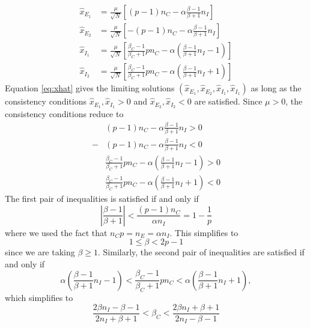 \documentclass[11pt,reqno]{amsart}
\begin{document}
\begin{equation}\label{eq:xhat}
    \begin{aligned}
        \hat{x}_{E_1} &= \frac{\mu}{\sqrt{N}}\left[ (p-1)n_C - \alpha \frac{\beta-1}{\beta+1}n_I \right] \\
        \hat{x}_{E_2} &= \frac{\mu}{\sqrt{N}}\left[ -(p-1)n_C - \alpha \frac{\beta-1}{\beta+1}n_I \right] \\
        \hat{x}_{I_1} &= \frac{\mu}{\sqrt{N}}\left[  \frac{\beta_C-1}{\beta_C+1} p n_C - \alpha \left( \frac{\beta-1}{\beta+1}n_I - 1 \right) \right] \\
        \hat{x}_{I_2} &= \frac{\mu}{\sqrt{N}}\left[  \frac{\beta_C-1}{\beta_C+1} p n_C - \alpha \left( \frac{\beta-1}{\beta+1}n_I + 1 \right) \right] 
    \end{aligned}
\end{equation}
Equation \cref{eq:xhat} gives the limiting solutions $(\hat{x}_{E_1}, \hat{x}_{E_2}, \hat{x}_{I_1}, \hat{x}_{I_1})$ as long as the consistency conditions $\hat{x}_{E_1}, \hat{x}_{I_1} > 0$ and $\hat{x}_{E_2}, \hat{x}_{I_2} < 0$ are satisfied. Since $\mu > 0$, the consistency conditions reduce to
\begin{equation}\label{eq:consistency}
    \begin{aligned}
        &(p-1)n_C - \alpha \frac{\beta-1}{\beta+1}n_I > 0 \\
        -&(p-1)n_C - \alpha \frac{\beta-1}{\beta+1}n_I < 0 \\
        &\frac{\beta_C-1}{\beta_C+1} p n_C - \alpha \left( \frac{\beta-1}{\beta+1}n_I - 1 \right) > 0 \\
        &\frac{\beta_C-1}{\beta_C+1} p n_C - \alpha \left( \frac{\beta-1}{\beta+1}n_I + 1 \right) < 0 
    \end{aligned}
\end{equation}
The first pair of inequalities is satisfied if and only if
\[
    \left| \frac{\beta-1}{\beta+1} \right| < \frac{(p-1)n_C}{\alpha n_I} = 1 - \frac{1}{p}
\]
where we used the fact that $n_C p = n_E = \alpha n_I$. This simplifies to 
\begin{equation}\label{eq:betacond}
    1 \leq \beta < 2p-1
\end{equation}
since we are taking $\beta \geq 1$. Similarly, the second pair of inequalities are satisfied if and only if 
\[
    \alpha \left( \frac{\beta-1}{\beta+1}n_I - 1 \right) < \frac{\beta_C-1}{\beta_C+1} p n_C < \alpha \left( \frac{\beta-1}{\beta+1}n_I + 1 \right),
\]
which simplifies to 
\begin{equation}
    \frac{2 \beta n_I - \beta - 1}{2 n_I + \beta + 1} < \beta_C < \frac{2 \beta n_I + \beta + 1}{2 n_I - \beta - 1} 
\end{equation}
\end{document}
